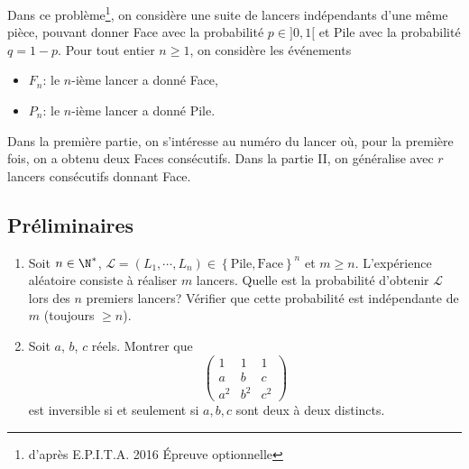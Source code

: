 Dans ce problème\footnote{d'après E.P.I.T.A. 2016 \'Epreuve optionnelle}, on considère une suite de lancers indépendants d'une même pièce, pouvant donner Face avec la probabilité $p \in ] 0, 1 [$ et Pile avec la probabilité $q = 1 - p$.\newline
Pour tout entier $n \geq 1$, on considère les événements
\begin{itemize}
 \item $F_n$: le $n$-ième lancer a donné Face,
 \item $P_n$: le $n$-ième lancer a donné Pile.
\end{itemize}
Dans la première partie, on s'intéresse au numéro du lancer où, pour la première fois, on a obtenu deux Faces consécutifs. Dans la partie II, on généralise avec $r$ lancers consécutifs donnant Face.

\subsection*{Préliminaires}
\begin{enumerate}
 \item Soit $n\in \N^*$, $\mathcal{L} = (L_1, \cdots, L_n) \in \left\lbrace \text{Pile} ,\text{Face} \right\rbrace ^n$ et $m\geq n$. L'expérience aléatoire consiste à réaliser $m$ lancers. Quelle est la probabilité d'obtenir $\mathcal{L}$ lors des $n$ premiers lancers? Vérifier que cette probabilité est indépendante de $m$ (toujours  $\geq n$).
 \item Soit $a$, $b$, $c$ réels. Montrer que  
\begin{displaymath}
\begin{pmatrix}
 1 & 1 & 1 \\ a & b & c \\ a^2 & b^2 & c^2
\end{pmatrix}
\end{displaymath}
est inversible si et seulement si $a, b,c$ sont deux à deux distincts.
\end{enumerate}



